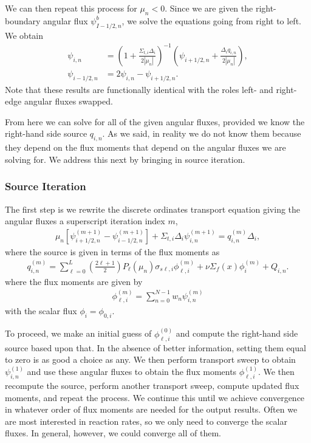 We can then repeat this process for $\mu_n < 0$. Since we are given the right-boundary angular flux $\psi_{I-1/2,n}^b$, we solve the equations going from right to left. We obtain
\begin{subequations}
\begin{align}
  \psi_{i,n} &= \left( 1 + \frac{\Sigma_{t,i} \Delta_i}{ 2 | \mu_n | } \right)^{-1} \left( \psi_{i+1/2,n} + \frac{ \Delta_i q_{i,n} }{ 2 | \mu_n | } \right) , \\
  \psi_{i-1/2,n} &= 2 \psi_{i,n} - \psi_{i+1/2,n} .
\end{align}
\end{subequations}
Note that these results are functionally identical with the roles left- and right-edge angular fluxes swapped.

From here we can solve for all of the given angular fluxes, provided we know the right-hand side source $q_{i,n}$. As we said, in reality we do not know them because they depend on the flux moments that depend on the angular fluxes we are solving for. We address this next by bringing in source iteration.

\subsubsection{Source Iteration}

The first step is we rewrite the discrete ordinates transport equation giving the angular fluxes a superscript iteration index $m$, 
\begin{align}
  \mu_n \left[ \psi_{i+1/2,n}^{(m+1)} - \psi_{i-1/2,n}^{(m+1)} \right] + \Sigma_{t,i} \Delta_i \psi_{i,n}^{(m+1)} = q_{i,n}^{(m)} \Delta_i , \label{Eq:neutronics_discreteOrdinatesTransportEquation_Iteration}
\end{align}
where the source is given in terms of the flux moments as
\begin{align}
  q_{i,n}^{(m)} = \sum_{\ell=0}^L \left( \frac{2\ell+1}{2} \right) P_\ell(\mu_n) \sigma_{s\ell,i} \phi_{\ell,i}^{(m)} + \nu\Sigma_f(x) \phi_i^{(m)} + Q_{i,n}.
\end{align}
where the flux moments are given by
\begin{align}
  \phi_{\ell,i}^{(m)} = \sum_{n=0}^{N-1} w_n \psi_{i,n}^{(m)} 
\end{align}
with the scalar flux $\phi_i = \phi_{0,i}$.

To proceed, we make an initial guess of $\phi_{\ell,i}^{(0)}$ and compute the right-hand side source based upon that. In the absence of better information, setting them equal to zero is as good a choice as any. We then perform transport sweep to obtain $\psi_{i,n}^{(1)}$ and use these angular fluxes to obtain the flux moments $\phi_{\ell,i}^{(1)}$. We then recompute the source, perform another transport sweep, compute updated flux moments, and repeat the process. We continue this until we achieve convergence in whatever order of flux moments are needed for the output results. Often we are most interested in reaction rates, so we only need to converge the scalar fluxes. In general, however, we could converge all of them.


